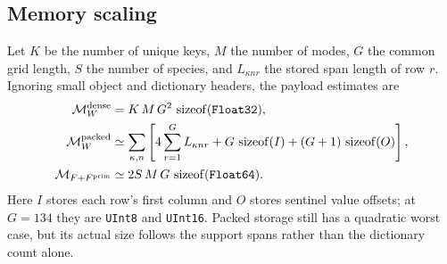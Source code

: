 \documentclass[11pt]{article}
\begin{document}
\pagebreak
\subsection{Memory scaling}

Let $K$ be the number of unique keys, $M$ the number of modes, $G$ the common
grid length, $S$ the number of species, and $L_{\kappa nr}$ the stored span
length of row $r$.  Ignoring small object and dictionary headers, the payload
estimates are
\begin{align}
\mathcal M_W^{\rm dense} &=
K\,M\,G^2\,\operatorname{sizeof}(\texttt{Float32}),\\
\mathcal M_W^{\rm packed} &\simeq
\sum_{\kappa,n}\left[
4\sum_{r=1}^{G}L_{\kappa nr}
+G\,\operatorname{sizeof}(I)
+(G+1)\,\operatorname{sizeof}(O)\right],\\
\mathcal M_{F+F^{\rm prim}} &\simeq
2S\,M\,G\,\operatorname{sizeof}(\texttt{Float64}).
\label{eq:cascade-memory}
\end{align}
Here $I$ stores each row's first column and $O$ stores sentinel value offsets;
at $G=134$ they are \texttt{UInt8} and \texttt{UInt16}.  Packed storage still
has a quadratic worst case, but its actual size follows the support spans
rather than the dictionary count alone.
\end{document}
